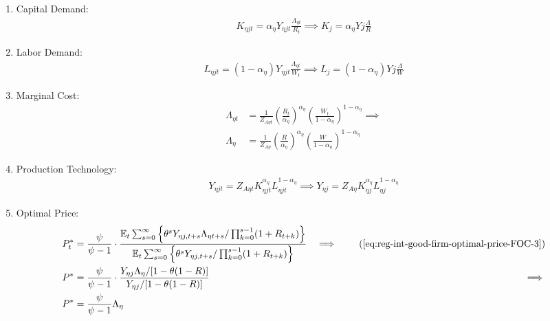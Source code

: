 \documentclass[
	thesis.tex
	]{subfiles}
\begin{document}
\begin{enumerate}
	\item Capital Demand:
	\begin{align}
		\label{eq:reg-ss-int-good-firm-FOC-Kt}
		K_{\eta jt} = {\alpha_\eta} Y_{\eta jt} \frac{\Lambda_{\eta t}}{R_t} \implies 
		K_{j} = {\alpha_\eta} Y{j} \frac{\Lambda}{R}
	\end{align}
	
	\item Labor Demand:
	\begin{align}
		\label{eq:reg-ss-int-good-firm-FOC-Lt}
		L_{\eta jt} = (1-{\alpha_\eta}) Y_{\eta jt} \frac{\Lambda_{\eta t}}{W_t} \implies 
		L_{j} = (1-{\alpha_\eta}) Y{j} \frac{\Lambda}{W}
	\end{align}
	
	
	\item Marginal Cost:
	\begin{align}
		\Lambda_{\eta t} &= \frac{1}{Z_{A\eta t}} \left( \frac{R_t}{{\alpha_\eta}} \right)^{{\alpha_\eta}} \left( \frac{W_t}{1-{\alpha_\eta}} \right)^{1-{\alpha_\eta}} \implies \nonumber \\
		\Lambda_{\eta} &= \frac{1}{Z_{A\eta}} \left( \frac{R}{{\alpha_\eta}} \right)^{{\alpha_\eta}} \left( \frac{W}{1-{\alpha_\eta}} \right)^{1-{\alpha_\eta}} \label{eq:reg-ss-int-good-firm-MC-2}
	\end{align}
	
	\item Production Technology:
	\begin{align}
		Y_{\eta jt} = Z_{A\eta t} K_{\eta jt}^{\alpha_\eta} L_{\eta jt}^{1-{\alpha_\eta}} \implies Y_{\eta j} = Z_{A\eta} K_{\eta j}^{\alpha_\eta} L_{\eta j}^{1-{\alpha_\eta}} \label{eq:reg-ss-int-good-firm-production-function}
	\end{align}
	
	\item Optimal Price:
	\begin{alignat}{2}
		P_t^\ast &= \frac{\psi}{\psi-1} \cdot \frac{\E \sum_{s=0}^{\infty} \left\{\theta^s Y_{\eta j,t+s} \Lambda_{\eta t+s} / \prod_{k=0}^{s-1}(1+R_{t+k}) \right\}} {\E \sum_{s=0}^{\infty} \left\{ \theta^s Y_{\eta j,t+s} / \prod_{k=0}^{s-1}(1+R_{t+k}) \right\}} &\implies \tag{\ref{eq:reg-int-good-firm-optimal-price-FOC-3}} \\
		P^\ast &= \frac{\psi}{\psi-1} \cdot \frac{ Y_{\eta j} \Lambda_{\eta} / [1-\theta(1-R)]} {Y_{\eta j} / [1-\theta(1-R)]} &\implies \nonumber \\
		P^\ast &= \frac{\psi}{\psi-1} \Lambda_{\eta} \label{eq:reg-ss-int-good-firm-optimal-price-FOC-3}
	\end{alignat}
	

\end{enumerate}
\end{document}
